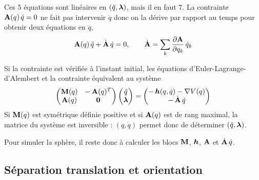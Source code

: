 Ces $5$ équations sont linéaires en $(\ddot q,\bm{\lambda})$, mais
il en faut $7$. La contrainte $\mathbf{A}(q)\,\dot q = 0$ ne fait pas
intervenir $\ddot q$ donc on la dérive par rapport au temps pour obtenir
deux équations en $\ddot q$,
\[
    \mathbf{A}(q)\,\ddot q + \dot{\mathbf{A}}\,\dot q = 0,
    \qquad
    \dot{\mathbf{A}} = \sum_k \frac{\partial \mathbf{A}}{\partial q_k}\,\dot q_k
\]

\begin{proposition}
    Si la contrainte est vérifiée à l'instant initial, les équations
    d'Euler-Lagrange-d'Alembert et la contrainte équivalent au système
    \[
        \begin{pmatrix}
            \mathbf{M}(q) & -\,\mathbf{A}(q)^T\\
            \mathbf{A}(q) & \mathbf{0}
        \end{pmatrix}
        \begin{pmatrix}
            \ddot q\\ \bm{\lambda}
        \end{pmatrix}
        = \begin{pmatrix}
            -\,\bm{h}(q,\dot q) - \nabla V(q)\\
            -\,\dot{\mathbf{A}}\,\dot q
        \end{pmatrix}
    \]
    Si $\mathbf{M}(q)$ est symétrique définie positive et si
    $\mathbf{A}(q)$ est de rang maximal, la matrice du système est
    inversible : $(q,\dot q)$ permet donc de déterminer $(\ddot q,\bm{\lambda})$.
\end{proposition}

Pour simuler la sphère, il reste donc à calculer les blocs
$\mathbf{M}$, $\bm{h}$, $\mathbf{A}$ et $\dot{\mathbf{A}}\,\dot q$.

\subsection{Séparation translation et orientation}

